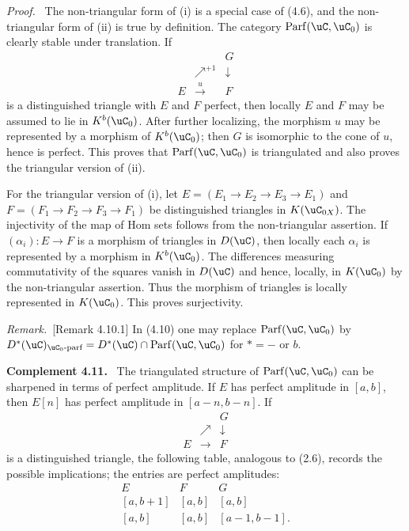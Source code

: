 \documentclass[11pt]{article}
\theoremstyle{plain}
\theoremstyle{definition}
\theoremstyle{remark}
\newenvironment{statement}[1]{\par\medskip\noindent\textbf{#1.}\ }{\par\medskip}
\newenvironment{prooftext}{\par\noindent\textit{Proof.}\ }{\par\medskip}
\newenvironment{remarktext}{\par\medskip\noindent\textit{Remark.}\ }{\par\medskip}
\providecommand{\Parf}{\operatorname{Parf}}
\begin{document}
\begin{prooftext}
The non-triangular form of (i) is a special case of (4.6), and the non-triangular form of (ii) is true by definition. The category $\Parf(\uC,\uC_0)$ is clearly stable under translation. If
\[
\begin{array}{ccc}
&&G\\
&\nearrow^{+1}&\downarrow\\
E&\xrightarrow{u}&F
\end{array}
\]
is a distinguished triangle with $E$ and $F$ perfect, then locally $E$ and $F$ may be assumed to lie in $K^b(\uC_0)$. After further localizing, the morphism $u$ may be represented by a morphism of $K^b(\uC_0)$; then $G$ is isomorphic to the cone of $u$, hence is perfect. This proves that $\Parf(\uC,\uC_0)$ is triangulated and also proves the triangular version of (ii).

For the triangular version of (i), let $E=(E_1\to E_2\to E_3\to E_1)$ and $F=(F_1\to F_2\to F_3\to F_1)$ be distinguished triangles in $K(\uC_{0X})$. The injectivity of the map of Hom sets follows from the non-triangular assertion. If $(\alpha_i):E\to F$ is a morphism of triangles in $D(\uC)$, then locally each $\alpha_i$ is represented by a morphism in $K^b(\uC_0)$. The differences measuring commutativity of the squares vanish in $D(\uC)$ and hence, locally, in $K(\uC_0)$ by the non-triangular assertion. Thus the morphism of triangles is locally represented in $K(\uC_0)$. This proves surjectivity.
\end{prooftext}

\begin{remarktext}[Remark 4.10.1]
In (4.10) one may replace $\Parf(\uC,\uC_0)$ by $D^*(\uC)_{\uC_0\text{-parf}}=D^*(\uC)\cap\Parf(\uC,\uC_0)$ for $*=-$ or $b$.
\end{remarktext}

\begin{statement}{Complement 4.11}
The triangulated structure of $\Parf(\uC,\uC_0)$ can be sharpened in terms of perfect amplitude. If $E$ has perfect amplitude in $[a,b]$, then $E[n]$ has perfect amplitude in $[a-n,b-n]$. If
\[
\begin{array}{ccc}
&&G\\
&\nearrow&\downarrow\\
E&\longrightarrow&F
\end{array}
\]
is a distinguished triangle, the following table, analogous to (2.6), records the possible implications; the entries are perfect amplitudes:
\[
\begin{array}{ccc}
E&F&G\\
{}[a,b+1]&[a,b]&[a,b]\\
{}[a,b]&[a,b]&[a-1,b-1].
\end{array}
\]
\end{statement}
\end{document}
